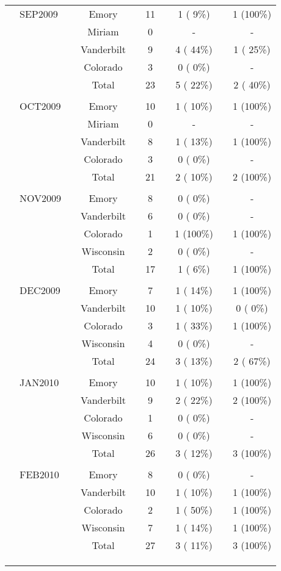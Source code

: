 \documentclass[dvips,10pt]{article}
\begin{document}
\begin{table}[t]
\begin{center}
\begin{tabular}{ @{}l@{}
@{}l@{}@{}p{1.5em}@{}@{}c@{}@{}p{1.5em}@{}@{}c@{}@{}p{1.5em}@{}@{}c@{}@{}p{1.5em}@{}@{}c@{}
}
\\
& SEP2009 && Emory && 11 && 1 (  9\%) && 1 (100\%) \\
&  && Miriam && 0 && - && - \\
&  && Vanderbilt && 9 && 4 ( 44\%) && 1 ( 25\%) \\
&  && Colorado && 3 && 0 (  0\%) && - \\
&  && Total && 23 && 5 ( 22\%) && 2 ( 40\%) \\
&  &&  &&  &&  &&  \\
& OCT2009 && Emory && 10 && 1 ( 10\%) && 1 (100\%) \\
&  && Miriam && 0 && - && - \\
&  && Vanderbilt && 8 && 1 ( 13\%) && 1 (100\%) \\
&  && Colorado && 3 && 0 (  0\%) && - \\
&  && Total && 21 && 2 ( 10\%) && 2 (100\%) \\
&  &&  &&  &&  &&  \\
& NOV2009 && Emory && 8 && 0 (  0\%) && - \\
&  && Vanderbilt && 6 && 0 (  0\%) && - \\
&  && Colorado && 1 && 1 (100\%) && 1 (100\%) \\
&  && Wisconsin && 2 && 0 (  0\%) && - \\
&  && Total && 17 && 1 (  6\%) && 1 (100\%) \\
&  &&  &&  &&  &&  \\
& DEC2009 && Emory && 7 && 1 ( 14\%) && 1 (100\%) \\
&  && Vanderbilt && 10 && 1 ( 10\%) && 0 (  0\%) \\
&  && Colorado && 3 && 1 ( 33\%) && 1 (100\%) \\
&  && Wisconsin && 4 && 0 (  0\%) && - \\
&  && Total && 24 && 3 ( 13\%) && 2 ( 67\%) \\
&  &&  &&  &&  &&  \\
& JAN2010 && Emory && 10 && 1 ( 10\%) && 1 (100\%) \\
&  && Vanderbilt && 9 && 2 ( 22\%) && 2 (100\%) \\
&  && Colorado && 1 && 0 (  0\%) && - \\
&  && Wisconsin && 6 && 0 (  0\%) && - \\
&  && Total && 26 && 3 ( 12\%) && 3 (100\%) \\
&  &&  &&  &&  &&  \\
& FEB2010 && Emory && 8 && 0 (  0\%) && - \\
&  && Vanderbilt && 10 && 1 ( 10\%) && 1 (100\%) \\
&  && Colorado && 2 && 1 ( 50\%) && 1 (100\%) \\
&  && Wisconsin && 7 && 1 ( 14\%) && 1 (100\%) \\
&  && Total && 27 && 3 ( 11\%) && 3 (100\%) \\
&  &&  &&  &&  &&  \\
\\
\hline \\


\end{tabular}
\end{center}
\end{table}
\end{document}
